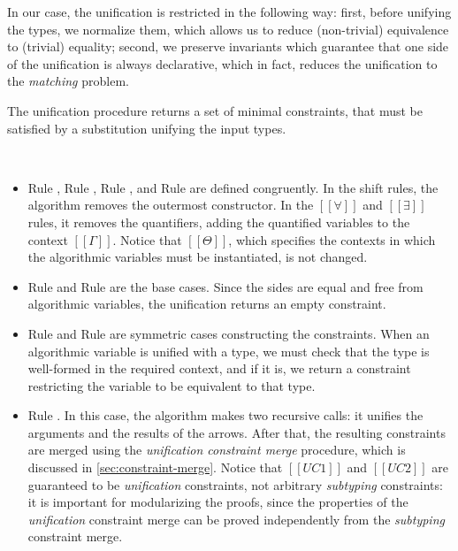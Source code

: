 \documentclass[a4,natbib=false]{article}
\newcommand{\ruleref}[1]{Rule \nameref{#1}}
\begin{document}
In our case, the unification is restricted in the following way:
first, before unifying the types, we normalize them, which 
allows us to reduce (non-trivial) equivalence to (trivial) equality;
second, we preserve invariants which guarantee that
one side of the unification is always declarative, which in fact, 
reduces the unification to the \emph{matching} problem.

The unification procedure
returns a set of minimal constraints,
that must be satisfied by a substitution
unifying the input types.

\begin{algorithm}[Unification]
  \hfill
  \begin{multicols}{2}
  \ottdefnUNUnif{}
  \columnbreak\\
  \ottdefnUPUnif{}
  \end{multicols}
\end{algorithm}


\begin{itemize}
  \item \ruleref{\ottdruleUShiftULabel}, \ruleref{\ottdruleUShiftDLabel}, 
    \ruleref{\ottdruleUForallLabel}, and \ruleref{\ottdruleUExistsLabel}
    are defined congruently. In the shift rules, the algorithm
    removes the outermost constructor. In the
    $[[∀]]$ and $[[∃]]$ rules, it removes the quantifiers,
    adding the quantified variables to the context $[[Γ]]$.
    Notice that $[[Θ]]$, which specifies
    the contexts in which the algorithmic variables must be instantiated,
    is not changed.
  \item \ruleref{\ottdruleUNVarLabel} and \ruleref{\ottdruleUPVarLabel} 
    are the base cases. 
    Since the sides are equal and free from algorithmic variables,
    the unification returns an empty constraint. 
  \item \ruleref{\ottdruleUNVarLabel} and \ruleref{\ottdruleUPVarLabel}
    are symmetric cases constructing the constraints. 
    When an algorithmic variable is unified with a type, 
    we must check that the type is well-formed in the required context,
    and if it is, we return a constraint restricting the variable
    to be equivalent to that type.
  \item \ruleref{\ottdruleUArrowLabel}.
    In this case, the algorithm makes two recursive calls:
    it unifies the arguments and the results of the arrows.
    After that, the resulting constraints are merged using the
    \emph{unification constraint merge} procedure, 
    which is discussed in \cref{sec:constraint-merge}.
    Notice that $[[UC1]]$ and $[[UC2]]$ are guaranteed to be
    \emph{unification} constraints, not arbitrary \emph{subtyping} 
    constraints: it is important for modularizing the proofs, 
    since the properties of the \emph{unification} constraint merge
    can be proved independently from the \emph{subtyping} constraint merge.
\end{itemize}
\end{document}
